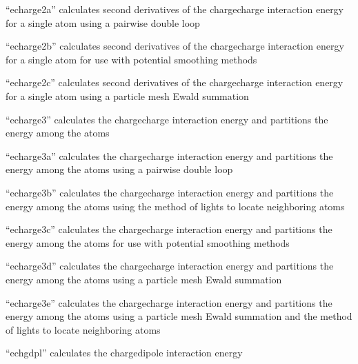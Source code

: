 \documentclass[letterpaper,11pt,english]{sphinxmanual}
\begin{document}

“echarge2a” calculates second derivatives of the charge\sphinxhyphen{}charge interaction energy for a single atom using a pairwise double loop


“echarge2b” calculates second derivatives of the charge\sphinxhyphen{}charge interaction energy for a single atom for use with potential smoothing methods


“echarge2c” calculates second derivatives of the charge\sphinxhyphen{}charge interaction energy for a single atom using a particle mesh Ewald summation


“echarge3” calculates the charge\sphinxhyphen{}charge interaction energy and partitions the energy among the atoms


“echarge3a” calculates the charge\sphinxhyphen{}charge interaction energy and partitions the energy among the atoms using a pairwise double loop


“echarge3b” calculates the charge\sphinxhyphen{}charge interaction energy and partitions the energy among the atoms using the method of lights to locate neighboring atoms


“echarge3c” calculates the charge\sphinxhyphen{}charge interaction energy and partitions the energy among the atoms for use with potential smoothing methods


“echarge3d” calculates the charge\sphinxhyphen{}charge interaction energy and partitions the energy among the atoms using a particle mesh Ewald summation


“echarge3e” calculates the charge\sphinxhyphen{}charge interaction energy and partitions the energy among the atoms using a particle mesh Ewald summation and the method of lights to locate neighboring atoms


“echgdpl” calculates the charge\sphinxhyphen{}dipole interaction energy
\end{document}

